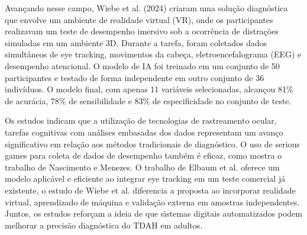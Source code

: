 Avançando nesse campo, Wiebe et al. (2024) criaram uma solução diagnóstica que
envolve um ambiente de realidade virtual (VR), onde os participantes realizavam um teste de
desempenho imersivo sob a ocorrência de distrações simuladas em um ambiente 3D.
Durante a tarefa, foram coletados dados simultâneos de eye tracking, movimentos da
cabeça, eletroencefalograma (EEG) e desempenho atencional. O modelo de IA foi treinado
em um conjunto de 50 participantes e testado de forma independente em outro conjunto de
36 indivíduos. O modelo final, com apenas 11 variáveis selecionadas, alcançou 81\% de
acurácia, 78\% de sensibilidade e 83\% de especificidade no conjunto de teste.

Os estudos indicam que a utilização de tecnologias de rastreamento ocular, tarefas
cognitivas com análises embasadas dos dados representam um avanço significativo em
relação aos métodos tradicionais de diagnóstico. O uso de serious games para coleta de
dados de desempenho também é eficaz, como mostra o trabalho de Nascimento e Menezes.
O trabalho de Elbaum et al. oferece um modelo aplicável e eficiente ao integrar eye tracking
em um teste comercial já existente, o estudo de Wiebe et al. diferencia a proposta ao
incorporar realidade virtual, aprendizado de máquina e validação externa em amostras
independentes. Juntos, os estudos reforçam a ideia de que sistemas digitais automatizados
podem melhorar a precisão diagnóstica do TDAH em adultos.

